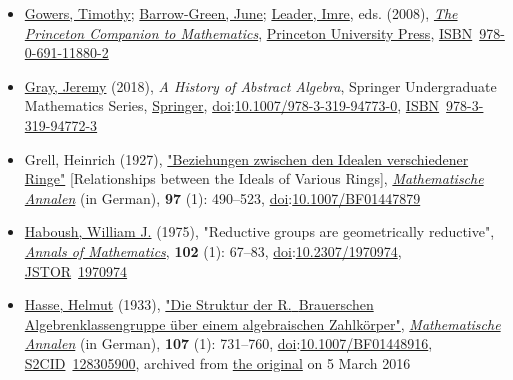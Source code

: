 \begin{itemize}
\item
  \href{https://en.wikipedia.org/wiki/Timothy_Gowers}{Gowers, Timothy}; \href{https://en.wikipedia.org/wiki/June_Barrow-Green}{Barrow-Green, June}; \href{https://en.wikipedia.org/wiki/Imre_Leader}{Leader, Imre}, eds. (2008), \href{https://en.wikipedia.org/wiki/The_Princeton_Companion_to_Mathematics}{\emph{The Princeton Companion to Mathematics}}, \href{https://en.wikipedia.org/wiki/Princeton_University_Press}{Princeton University Press}, \href{https://en.wikipedia.org/wiki/ISBN_(identifier)}{ISBN}{~}\href{https://en.wikipedia.org/wiki/Special:BookSources/978-0-691-11880-2}{978-0-691-11880-2}{}
\item
  \href{https://en.wikipedia.org/wiki/Jeremy_Gray_(mathematician)}{Gray, Jeremy} (2018), \emph{A History of Abstract Algebra}, Springer Undergraduate Mathematics Series, \href{https://en.wikipedia.org/wiki/Springer_Science+Business_Media}{Springer}, \href{https://en.wikipedia.org/wiki/Doi_(identifier)}{doi}:\href{https://doi.org/10.1007\%2F978-3-319-94773-0}{10.1007/978-3-319-94773-0}, \href{https://en.wikipedia.org/wiki/ISBN_(identifier)}{ISBN}{~}\href{https://en.wikipedia.org/wiki/Special:BookSources/978-3-319-94772-3}{978-3-319-94772-3}{}
\item
  Grell, Heinrich (1927), {\href{https://link.springer.com/article/10.1007/BF01447879}{"Beziehungen zwischen den Idealen verschiedener Ringe"}} {{[}}Relationships between the Ideals of Various Rings{{]}}, \emph{\href{https://en.wikipedia.org/wiki/Mathematische_Annalen}{Mathematische Annalen}} (in German), \textbf{97} (1): {490--}523, \href{https://en.wikipedia.org/wiki/Doi_(identifier)}{doi}:\href{https://doi.org/10.1007\%2FBF01447879}{10.1007/BF01447879}{}
\item
  \href{https://en.wikipedia.org/wiki/William_Haboush}{Haboush, William J.} (1975), "Reductive groups are geometrically reductive", \emph{\href{https://en.wikipedia.org/wiki/Annals_of_Mathematics}{Annals of Mathematics}}, \textbf{102} (1): {67--}83, \href{https://en.wikipedia.org/wiki/Doi_(identifier)}{doi}:\href{https://doi.org/10.2307\%2F1970974}{10.2307/1970974}, \href{https://en.wikipedia.org/wiki/JSTOR_(identifier)}{JSTOR}{~}\href{https://www.jstor.org/stable/1970974}{1970974}{}
\item
  \href{https://en.wikipedia.org/wiki/Helmut_Hasse}{Hasse, Helmut} (1933), \href{https://web.archive.org/web/20160305072945/http://gdz.sub.uni-goettingen.de/index.php?id=11&PPN=GDZPPN002276062&L=1}{"Die Struktur der R.{~}Brauerschen Algebrenklassengruppe über einem algebraischen Zahlkörper"}, \emph{\href{https://en.wikipedia.org/wiki/Mathematische_Annalen}{Mathematische Annalen}} (in German), \textbf{107} (1): {731--}760, \href{https://en.wikipedia.org/wiki/Doi_(identifier)}{doi}:\href{https://doi.org/10.1007\%2FBF01448916}{10.1007/BF01448916}, \href{https://en.wikipedia.org/wiki/S2CID_(identifier)}{S2CID}{~}\href{https://api.semanticscholar.org/CorpusID:128305900}{128305900}, archived from \href{http://gdz.sub.uni-goettingen.de/index.php?id=11&PPN=GDZPPN002276062&L=1}{the original} on 5 March 2016{}

\end{itemize}
